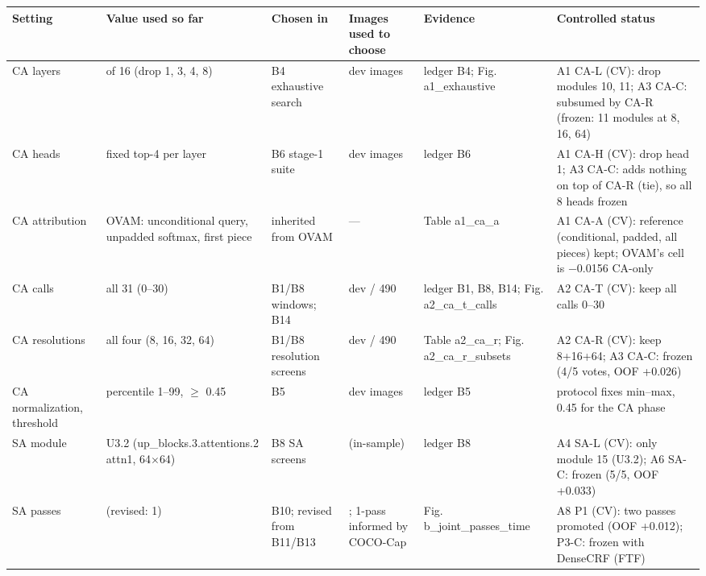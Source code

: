\begin{table}[H]\centering\scriptsize\setlength{\tabcolsep}{3pt}
\begin{tabular}{>{\raggedright\arraybackslash}p{1.40cm}>{\raggedright\arraybackslash}p{2.27cm}>{\raggedright\arraybackslash}p{2.52cm}>{\raggedright\arraybackslash}p{1.54cm}>{\raggedright\arraybackslash}p{1.73cm}>{\raggedright\arraybackslash}p{4.72cm}}
\toprule
Setting & Value used so far & Chosen in & Images used to choose & Evidence & Controlled status \\
\midrule
CA layers & 12 of 16 (drop 1, 3, 4, 8) & B4 exhaustive search & 99 dev images & ledger B4; Fig. a1\_\allowbreak{}exhaustive & A1 CA-L (CV): drop modules 10, 11; A3 CA-C: subsumed by CA-R (frozen: 11 modules at 8, 16, 64) \\
CA heads & fixed top-4 per layer & B6 stage-1 suite & 99 dev images & ledger B6 & A1 CA-H (CV): drop head 1; A3 CA-C: adds nothing on top of CA-R (tie), so all 8 heads frozen \\
CA attribution & OVAM: unconditional query, unpadded softmax, first piece & inherited from OVAM & --- & Table a1\_\allowbreak{}ca\_\allowbreak{}a & A1 CA-A (CV): reference (conditional, padded, all pieces) kept; OVAM's cell is $-$0.0156 CA-only \\
CA calls & all 31 (0--30) & B1/\allowbreak{}B8 windows; B14 & 99 dev /\allowbreak{} 490 & ledger B1, B8, B14; Fig. a2\_\allowbreak{}ca\_\allowbreak{}t\_\allowbreak{}calls & A2 CA-T (CV): keep all calls 0--30 \\
CA resolutions & all four (8, 16, 32, 64) & B1/\allowbreak{}B8 resolution screens & 99 dev /\allowbreak{} 490 & Table a2\_\allowbreak{}ca\_\allowbreak{}r; Fig. a2\_\allowbreak{}ca\_\allowbreak{}r\_\allowbreak{}subsets & A2 CA-R (CV): keep 8+16+64; A3 CA-C: frozen (4/\allowbreak{}5 votes, OOF +0.026) \\
CA normalization, threshold & percentile 1--99, $\geq$ 0.45 & B5 & 99 dev images & ledger B5 & protocol fixes min--max, 0.45 for the CA phase \\
SA module & U3.2 (up\_\allowbreak{}blocks.3.attentions.2 attn1, 64$\times$64) & B8 SA screens & 490 (in-sample) & ledger B8 & A4 SA-L (CV): only module 15 (U3.2); A6 SA-C: frozen (5/\allowbreak{}5, OOF +0.033) \\
SA passes & 4 (revised: 1) & B10; revised from B11/\allowbreak{}B13 & 490; 1-pass informed by COCO-Cap & Fig. b\_\allowbreak{}joint\_\allowbreak{}passes\_\allowbreak{}time & A8 P1 (CV): two passes promoted (OOF +0.012); P3-C: frozen with DenseCRF (FTF) \\

\end{tabular}
\end{table}
